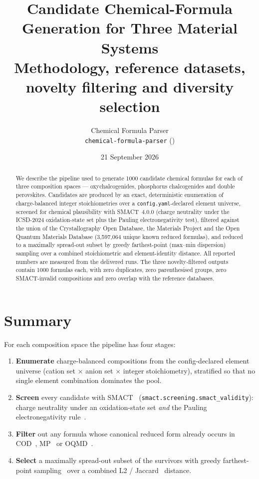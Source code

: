 \documentclass[11pt,a4paper]{article}
\title{\textbf{Candidate Chemical-Formula Generation for Three Material Systems}\\[4pt]
       \large Methodology, reference datasets, novelty filtering and diversity selection}
\author{Chemical Formula Parser\\
        \small\texttt{chemical-formula-parser} (\code{Chemical-Formula-Parser})}
\date{21 September 2026}
\newcommand{\code}[1]{\texttt{#1}}
\begin{document}
\maketitle

\begin{abstract}
\noindent
We describe the pipeline used to generate 1000 candidate chemical formulas for each of three
composition spaces --- oxychalcogenides, phosphorus chalcogenides and double perovskites.
Candidates are produced by an exact, deterministic enumeration of charge-balanced integer
stoichiometries over a \code{config.yaml}-declared element universe, screened for chemical
plausibility with SMACT~4.0.0 (charge neutrality under the ICSD-2024 oxidation-state set plus
the Pauling electronegativity test), filtered against the union of the Crystallography Open
Database, the Materials Project and the Open Quantum Materials Database
(3{,}597{,}064 unique known reduced formulas), and reduced to a maximally spread-out subset by
greedy farthest-point (max--min dispersion) sampling over a combined stoichiometric and
element-identity distance. All reported numbers are measured from the delivered runs. The three
novelty-filtered outputs contain 1000 formulas each, with zero duplicates, zero parenthesised
groups, zero SMACT-invalid compositions and zero overlap with the reference databases.
\end{abstract}

\tableofcontents
\vspace{2em}

\section{Summary}

For each composition space the pipeline has four stages:

\begin{enumerate}[label=(\arabic*)]
  \item \textbf{Enumerate} charge-balanced compositions from the config-declared element universe
        (cation set $\times$ anion set $\times$ integer stoichiometry), stratified so that no
        single element combination dominates the pool.
  \item \textbf{Screen} every candidate with SMACT~\cite{smact_joss,smact_chem}
        (\code{smact.screening.smact\_validity}): charge neutrality under an oxidation-state set
        \emph{and} the Pauling electronegativity rule~\cite{pauling}.
  \item \textbf{Filter} out any formula whose canonical reduced form already occurs in
        COD~\cite{cod}, MP~\cite{mp_apl,mp_api} or OQMD~\cite{oqmd}.
  \item \textbf{Select} a maximally spread-out subset of the survivors with greedy farthest-point
        sampling~\cite{gonzalez} over a combined L2 / Jaccard~\cite{jaccard} distance.
\end{enumerate}
\end{document}

